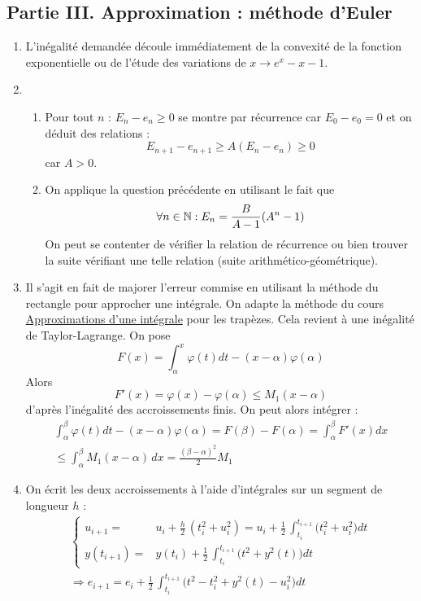 \subsection*{Partie III. Approximation : méthode d'Euler}
\begin{enumerate}
 \item L'inégalité demandée découle immédiatement de la convexité de la fonction exponentielle ou de l'étude des variations de $x\rightarrow e^x-x-1$.
\item \begin{enumerate}
 \item Pour tout $n$ : $E_n-e_n\geq 0$ se montre par récurrence car $E_0-e_0=0$ et on déduit des relations :
\begin{displaymath}
 E_{n+1} - e_{n+1}\geq A(E_n -e_n) \geq 0
\end{displaymath}
car $A>0$.
\item On applique la question précédente en utilisant le fait que
\begin{displaymath}
 \forall n\in \mathbb{N} : E_n = \frac{B}{A-1}(A^n -1)
\end{displaymath}
On peut se contenter de vérifier la relation de récurrence ou bien trouver la suite vérifiant une telle relation (suite arithmético-géométrique).
\end{enumerate}

\item Il s'agit en fait de majorer l'erreur commise en utilisant la méthode du rectangle pour approcher une intégrale. On adapte la méthode du cours \href{http://back.maquisdoc.net/data/cours\_nicolair/C2196.pdf}{Approximations d'une intégrale} pour les trapèzes. Cela revient à une inégalité de Taylor-Lagrange. On pose
\begin{displaymath}
 F(x) = \int_\alpha^x\varphi(t)dt - (x-\alpha)\varphi(\alpha)
\end{displaymath}
Alors
\begin{displaymath}
 F'(x) = \varphi(x) - \varphi(\alpha)\leq M_1(x-\alpha)
\end{displaymath}
d'après l'inégalité des accroissements finis. On peut alors intégrer :
\begin{multline*}
 \int_\alpha^\beta\varphi(t)dt - (x-\alpha)\varphi(\alpha)
=F(\beta)-F(\alpha) = \int_\alpha^\beta F'(x)dx \\
\leq \int_\alpha^\beta M_1(x-\alpha)\,dx
=\frac{(\beta-\alpha)^2}{2}M_1
\end{multline*}

\item On écrit les deux accroissements à l'aide d'intégrales sur un segment de longueur $h$ :
\begin{multline*}
 \left\lbrace 
\begin{aligned}
 u_{i+1} =& u_i + \frac{h}{2}\, (t_i^2+u_i^2) = u_i + \frac{1}{2}\,\int_{t_i}^{t_{i+1}}\bigl(t_i^2+u_i^2\bigr)dt \\
 y(t_{i+1}) =& y(t_i) + \frac{1}{2}\,\int_{t_i}^{t_{i+1}}\bigl(t^2+y^2(t)\bigr)dt
\end{aligned}
\right. \\
\Rightarrow
e_{i+1}= e_i + \frac{1}{2}\,\int_{t_i}^{t_{i+1}}\bigl(t^2-t_i^2+y^2(t)-u_i^2\bigr)dt
\end{multline*}


\end{enumerate}
